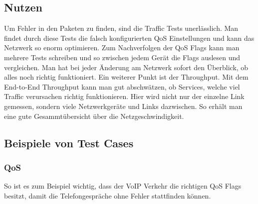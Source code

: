 \documentclass[a4,12pt]{scrartcl}
\begin{document}

\subsection{Nutzen}
Um Fehler in den Paketen zu finden, sind die Traffic Tests unerlässlich. Man findet durch diese Tests die falsch konfigurierten QoS Einstellungen und kann das Netzwerk so enorm optimieren. \newline
Zum Nachverfolgen der QoS Flags kann man mehrere Tests schreiben und so zwischen jedem Gerät die Flags auslesen und vergleichen.\newline\newline\newline
Man hat bei jeder Änderung am Netzwerk sofort den Überblick, ob alles noch richtig funktioniert.\newline\newline
Ein weiterer Punkt ist der Throughput. Mit dem End-to-End Throughput kann man gut abschwätzen, ob Services, welche viel Traffic verursachen richtig funktionieren. Hier wird nicht nur der einzelne Link gemessen, sondern viele Netzwerkgeräte und Links dazwischen. So erhält man eine gute Gesammtübersicht über die Netzgeschwindigkeit.

\subsection{Beispiele von Test Cases}
\subsubsection{QoS}
So ist es zum Beispiel wichtig, dass der VoIP Verkehr die richtigen QoS Flags besitzt, damit die Telefongespräche ohne Fehler stattfinden können. 
\end{document}
